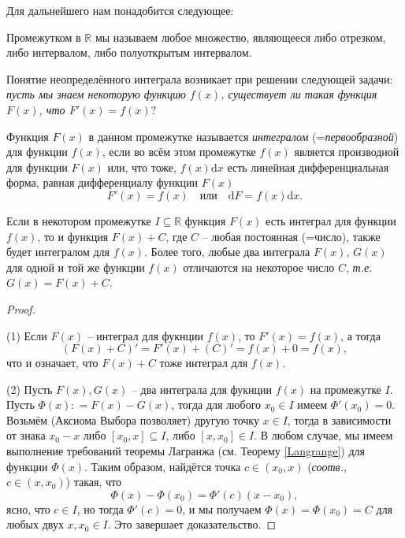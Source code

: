 Для дальнейшего нам понадобится следующее: 
\begin{definition}
    Промежутком в $\mathbb{R}$ мы называем любое множество, являющееся либо отрезком, либо интервалом, либо полуоткрытым интервалом.
\end{definition}

Понятие неопределённого интеграла возникает при решении следующей задачи:
\textit{пусть мы знаем некоторую функцию $f(x)$, существует ли такая функция $F(x)$, что $F'(x) =f(x)?$}

\begin{definition}\label{int1}
    Функция $F(x)$ в данном промежутке называется \textit{интегралом} (=\textit{первообразной}) для функции $f(x)$, если во всём этом промежутке $f(x)$ является производной для функции $F(x)$ или, что тоже, $f(x)\mathrm{d}x$ есть линейная дифференциальная форма, равная дифференциалу функции $F(x)$
    \[
     F'(x) = f(x) \quad \mbox{или} \quad  \mathrm{d}F = f(x) \mathrm{d}x.
    \]
\end{definition}

\begin{theorem}\label{int1=int2+C}
    Если в некотором промежутке $I \subseteq \mathbb{R}$ функция $F(x)$ есть интеграл для функции $f(x)$, то и функция $F(x) + C$, где $C$ -- любая постоянная (=число), также будет интегралом для $f(x)$. Более того, любые два интеграла $F(x)$, $G(x)$ для одной и той же функции $f(x)$ отличаются на некоторое число $C$, \textit{т.е.} $G(x) =F(x) + C.$
\end{theorem}

\begin{proof}~

(1) Если $F(x)$ -- интеграл для фукнции $f(x)$, то $F'(x) = f(x)$, а тогда
\[
 (F(x) + C)' = F'(x) + (C)' = f(x) + 0 = f(x),
\]
что и означает, что $F(x) +C$ тоже интеграл для $f(x).$

(2) Пусть $F(x), G(x)$ -- два интеграла для фукнции $f(x)$ на промежутке $I$. Пусть $\Phi(x): = F(x) - G(x)$, тогда для любого $x_0 \in I$ имеем $\Phi'(x_0) = 0$. Возьмём (Аксиома Выбора позволяет) другую точку $x \in I$, тогда в зависимости от знака $x_0 - x$ либо $[x_0, x] \subseteq I$, либо $[x,x_0] \in I$. В любом случае, мы имеем выполнение требований теоремы Лагранжа (см. Теорему \ref{Langrange}) для функции $\Phi(x)$. Таким образом, найдётся точка $c \in (x_0, x)$ (\textit{соотв.}, $c \in (x, x_0)$) такая, что
\[
 \Phi(x) - \Phi(x_0) = \Phi'(c)(x-x_0), 
\]
ясно, что $c \in I$, но тогда $\Phi'(c) = 0$, и мы получаем $\Phi(x) = \Phi(x_0) = C$ для любых двух $x,x_0 \in I$. Это завершает доказательство.    
\end{proof}

